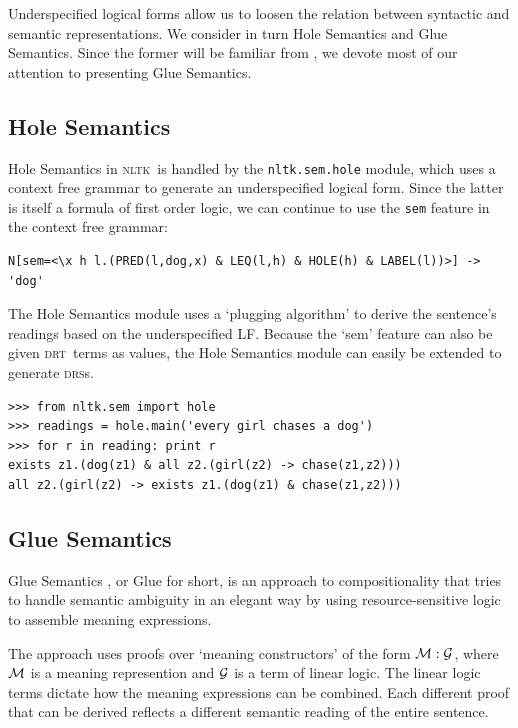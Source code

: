 \documentclass[11pt,a4paper]{article}
\newcommand{\DRS}{\textsc{drs}}
\newcommand{\DRT}{\textsc{drt}}
\newcommand{\NLTK}{\textsc{nltk}}
\newcommand{\dhgcode}[1]{{\tt #1}}
\begin{document}
Underspecified logical forms allow us to loosen the relation between
syntactic and semantic representations. We consider in turn Hole
Semantics and Glue Semantics. Since the former will be familiar from 
\citep{BB}, we devote most of our attention to presenting Glue
Semantics.

\subsection{Hole Semantics}

Hole Semantics in \NLTK\ is handled by the
\dhgcode{nltk.sem.hole} module, which uses a context free grammar to
generate an underspecified logical form.  Since the latter is itself a
formula of first order logic, we can continue to use the \texttt{sem} feature
in the context free grammar:

\small
\begin{verbatim}
N[sem=<\x h l.(PRED(l,dog,x) & LEQ(l,h) & HOLE(h) & LABEL(l))>] -> 'dog'
\end{verbatim}
\normalsize

The Hole Semantics module uses a `plugging algorithm' to derive the
sentence's readings based on the underspecified LF.  Because the `sem'
feature can also be given \DRT\ terms as values, the Hole Semantics module can
easily be extended to generate \DRS s.

\begin{verbatim}
>>> from nltk.sem import hole
>>> readings = hole.main('every girl chases a dog')
>>> for r in reading: print r
exists z1.(dog(z1) & all z2.(girl(z2) -> chase(z1,z2)))
all z2.(girl(z2) -> exists z1.(dog(z1) & chase(z1,z2)))
\end{verbatim}


\subsection{Glue Semantics}
Glue Semantics \citep{Dalrymple:1999:RRB,Dalrymple2001}, or Glue for
short, is an approach
to compositionality that tries to handle semantic ambiguity in an
elegant way by using resource-sensitive logic to assemble meaning
expressions.  

The approach uses proofs over `meaning constructors' of the form
$\cal{M}: \cal{G}$, where $\cal{M}$ is a meaning represention and
$\cal{G}$ is a term of linear logic.  The linear logic terms dictate
how the meaning expressions can be combined.  Each different proof
that can be derived reflects a different semantic reading of the
entire sentence.
\end{document}
